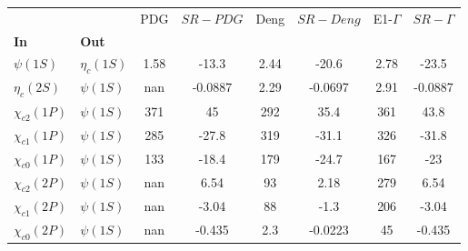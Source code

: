 \begin{tabular}{l|l|c|c|c|c|c|c}
\toprule
                &            &  PDG & $SR-PDG$ &  Deng & $SR-Deng$ &  E1-$\Gamma$ & $SR-\Gamma$ \\
\textbf{In} & \textbf{Out} &      &          &       &           &              &             \\
\midrule
\textbf{$\psi(1S)$} & \textbf{$\eta_{c}(1S)$} & 1.58 &    -13.3 &  2.44 &     -20.6 &         2.78 &       -23.5 \\
\textbf{$\eta_{c}(2S)$} & \textbf{$\psi(1S)$} &  nan &  -0.0887 &  2.29 &   -0.0697 &         2.91 &     -0.0887 \\
\textbf{$\chi_{c2}(1P)$} & \textbf{$\psi(1S)$} &  371 &       45 &   292 &      35.4 &          361 &        43.8 \\
\textbf{$\chi_{c1}(1P)$} & \textbf{$\psi(1S)$} &  285 &    -27.8 &   319 &     -31.1 &          326 &       -31.8 \\
\textbf{$\chi_{c0}(1P)$} & \textbf{$\psi(1S)$} &  133 &    -18.4 &   179 &     -24.7 &          167 &         -23 \\
\textbf{$\chi_{c2}(2P)$} & \textbf{$\psi(1S)$} &  nan &     6.54 &    93 &      2.18 &          279 &        6.54 \\
\textbf{$\chi_{c1}(2P)$} & \textbf{$\psi(1S)$} &  nan &    -3.04 &    88 &      -1.3 &          206 &       -3.04 \\
\textbf{$\chi_{c0}(2P)$} & \textbf{$\psi(1S)$} &  nan &   -0.435 &   2.3 &   -0.0223 &           45 &      -0.435 \\
\bottomrule
\end{tabular}

